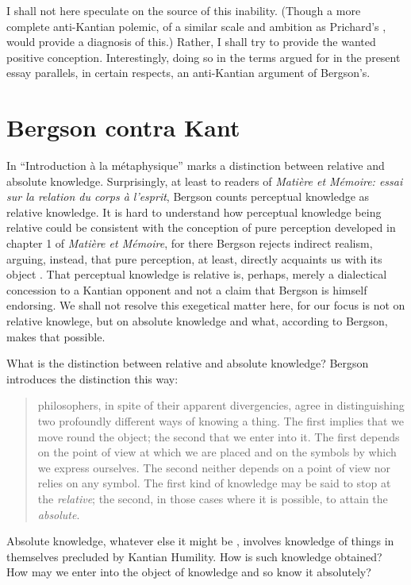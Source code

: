 I shall not here speculate on the source of this inability. (Though a more complete anti-Kantian polemic, of a similar scale and ambition as Prichard's \citeyear{Prichard:1909yg}, would provide a diagnosis of this.) Rather, I shall try to provide the wanted positive conception. Interestingly, doing so in the terms argued for in the present essay parallels, in certain respects, an anti-Kantian argument of Bergson's.


\section{Bergson contra Kant} %
\label{sec:bergson_contra_kant}

In ``Introduction \`{a} la m\'{e}taphysique'' \citet{Bergson:1903nx} marks a distinction between relative and absolute knowledge. Surprisingly, at least to readers of \emph{Mati\`{e}re et M\'{e}moire: essai sur la relation du corps \`{a} l'esprit}, Bergson counts perceptual knowledge as relative knowledge. It is hard to understand how perceptual knowledge being relative could be consistent with the conception of pure perception developed in chapter 1 of \emph{Mati\`{e}re et M\'{e}moire}, for there Bergson rejects indirect realism, arguing, instead, that pure perception, at least, directly acquaints us with its object \citep[though see][for a reconciliationist reading, 39--41]{Moore:1996rt}. That perceptual knowledge is relative is, perhaps, merely a dialectical concession to a Kantian opponent and not a claim that Bergson is himself endorsing. We shall not resolve this exegetical matter here, for our focus is not on relative knowlege, but on absolute knowledge and what, according to Bergson, makes that possible.

What is the distinction between relative and absolute knowledge? Bergson introduces the distinction this way:
\begin{quote}
	philosophers, in spite of their apparent divergencies, agree in distinguishing two profoundly different ways of knowing a thing. The first implies that we move round the object; the second that we enter into it. The first depends on the point of view at which we are placed and on the symbols by which we express ourselves. The second neither depends on a point of view nor relies on any symbol. The first kind of knowledge may be said to stop at the \emph{relative}; the second, in those cases where it is possible, to attain the \emph{absolute}. \citep[1]{Bergson:1912ud}
\end{quote}
Absolute knowledge, whatever else it might be \citep[for discussion see][chapter 6]{Lacey:1989bv}, involves knowledge of things in themselves precluded by Kantian Humility. How is such knowledge obtained? How may we enter into the object of knowledge and so know it absolutely?

